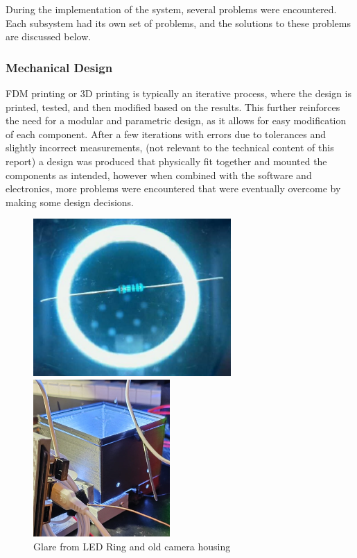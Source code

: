 During the implementation of the system, several problems were encountered. Each subsystem had its own set of problems, and the solutions to these problems are discussed below.

\subsubsection{Mechanical Design}
FDM printing or 3D printing is typically an iterative process, where the design is printed, tested, and then modified based on the results. This further reinforces the need for a modular and parametric design, as it allows for easy modification of each component. After a few iterations with errors due to tolerances and slightly incorrect measurements, (not relevant to the technical content of this report) a design was produced that physically fit together and mounted the components as intended, however when combined with the software and electronics, more problems were encountered that were eventually overcome by making some design decisions.

\begin{figure}[H]
    \centering
    \begin{minipage}[t]{0.49\textwidth}
        \centering
        \includegraphics[height=6cm]{imgs/design/ringlight.jpg}
    \end{minipage}
    \hfill
    \begin{minipage}[t]{0.49\textwidth}
        \centering
        \includegraphics[height=6cm]{imgs/design/tallcamera.jpeg}
    \end{minipage}
    \caption{Glare from LED Ring and old camera housing}
    \label{fig:glare}
  \end{figure}

